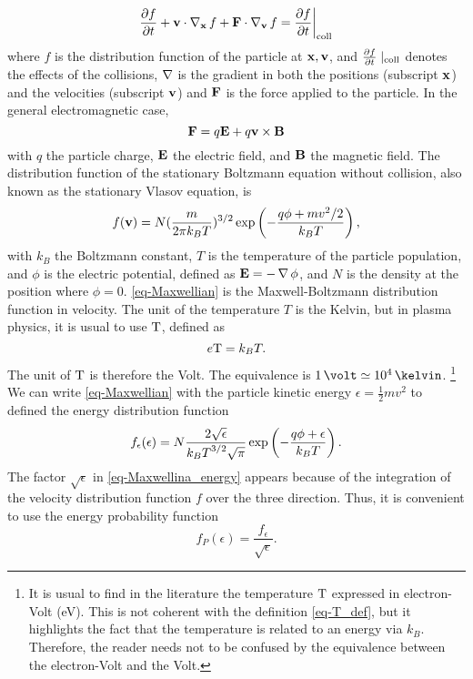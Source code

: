 \begin{equation} \label{eq-boltzmann}
\frac{\partial f}{\partial t}  + {\mathbf v} \cdot \operatorname{{\mathbf \nabla}}_{{\mathbf x}} f + {\mathbf F} \cdot  \operatorname{{\mathbf \nabla}}_{{\mathbf v}} f = \frac{\partial f}{\partial t}  \bigg\vert_{\rm coll} 
\end{equation}
where $f$ is the distribution function of the particle at ${\mathbf x}, {\mathbf v}$, and $\frac{\partial f}{\partial t}\mid_{\rm coll}$ denotes the effects of the collisions, $\operatorname{{\mathbf \nabla}}$ is the gradient in both the positions (subscript ${\mathbf x}$) and the velocities (subscript ${\mathbf v}$)  and ${\mathbf F}$ is the force applied to the particle.
In the general electromagnetic case,
\begin{equation*} \label{eq-forceEM}
  {\mathbf F} =  q {\mathbf E} + q {\mathbf v} \times {\mathbf B}
\end{equation*}
with $q$ the particle charge, ${\mathbf E}$ the electric field, and ${\mathbf B}$ the magnetic field.
The distribution function of the stationary Boltzmann equation without collision, also known as the stationary Vlasov equation, is
\begin{equation} \label{eq-Maxwellian}
  f({\mathbf v}) = N (\frac{m}{2 \pi k_B T})^{3/2} \exp \left( - \frac{q \phi + m v^2/2}{k_B T } \right),
\end{equation}
with $k_B$ the Boltzmann constant, $T$ is the temperature of the particle population, and $\phi$ is the electric potential, defined as ${\mathbf E} = -\operatorname{{\mathbf \nabla}} \phi$, and $N$ is the density at the position where $\phi = 0$.
\cref{eq-Maxwellian} is the Maxwell-Boltzmann distribution function in velocity.
The unit of the temperature $T$ is the Kelvin, but in plasma physics, it is usual to use ${\rm T}$, defined as
\begin{equation} \label{eq-T_def}
  e {\rm T} = k_B T.
\end{equation}
The unit of ${\rm T}$ is therefore the Volt.
The equivalence is $1 \,\volt \simeq 10^4 \,\kelvin$.
\footnote{It is usual to find in the literature the temperature ${\rm T}$ expressed in electron-Volt (eV).
This is not coherent with the definition \cref{eq-T_def}, but it highlights the fact that the temperature is related to an energy via $k_B$. Therefore, the reader needs not to be confused by the equivalence between the electron-Volt and the Volt.  }
We can write \cref{eq-Maxwellian} with the particle kinetic energy $\epsilon = \frac{1}{2} m v^2$ to defined the energy distribution function
\begin{equation} \label{eq-Maxwellina_energy}
  f_{\epsilon}(\epsilon) = N \frac{2 \sqrt{\epsilon}}{{k_B T}^{3/2} \sqrt{\pi}} \exp \left(- \frac{q \phi + \epsilon}{k_B T} \right).
\end{equation}
The factor $\sqrt{\epsilon}$ in \cref{eq-Maxwellina_energy} appears because of the integration of the velocity distribution function $f$ over the three direction.
Thus, it is convenient to use the energy probability function 
\begin{equation} \label{eq-EPF}
  f_P(\epsilon) = \frac{f_{\epsilon}}{\sqrt{\epsilon}}.
\end{equation}

